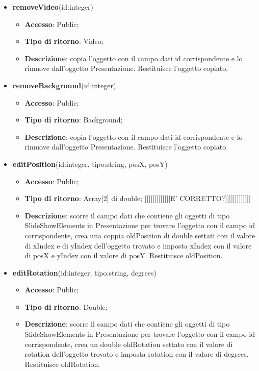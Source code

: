 {{\begin{itemize}
\begin{itemize}
			\end{itemize}
			\item \textbf{removeVideo}(id:integer)
			\begin{itemize}
				\item \textbf{Accesso}: Public;
				\item \textbf{Tipo di ritorno}: Video;
				\item \textbf{Descrizione}: copia l’oggetto con il campo dati id corrispondente e lo rimuove dall’oggetto Presentazione. Restituisce l’oggetto copiato.
			\end{itemize}
			\item \textbf{removeBackground}(id:integer)
			\begin{itemize}
				\item \textbf{Accesso}: Public;
				\item \textbf{Tipo di ritorno}: Background;
				\item \textbf{Descrizione}: copia l’oggetto con il campo dati id corrispondente e lo rimuove dall’oggetto Presentazione. Restituisce l’oggetto copiato.
			\end{itemize}
			\item \textbf{editPosition}(id:integer, tipo:string,  posX, posY)
			\begin{itemize}
				\item \textbf{Accesso}: Public;
				\item \textbf{Tipo di ritorno}: Array[2] di double; [[[[[[[[[[[[[E' CORRETTO?]]]]]]]]]]]]]
				\item \textbf{Descrizione}: scorre il campo dati che contiene gli oggetti di tipo SlideShowElements in Presentazione per trovare l’oggetto con il campo id corrispondente, crea una coppia oldPosition di double settati con il valore di xIndex e di yIndex dell’oggetto trovato e imposta xIndex con il valore di posX e yIndex con il valore di posY. Restituisce oldPosition.
			\end{itemize}
			\item \textbf{editRotation}(id:integer, tipo:string,  degrees)
			\begin{itemize}
				\item \textbf{Accesso}: Public;
				\item \textbf{Tipo di ritorno}: Double;
				\item \textbf{Descrizione}: scorre il campo dati che contiene gli oggetti di tipo SlideShowElements in Presentazione per trovare l’oggetto con il campo id corrispondente, crea un double oldRotation settato con il valore di rotation dell’oggetto trovato e imposta rotation con il valore di degrees. Restituisce oldRotation.

\end{itemize}
\end{itemize}}}
